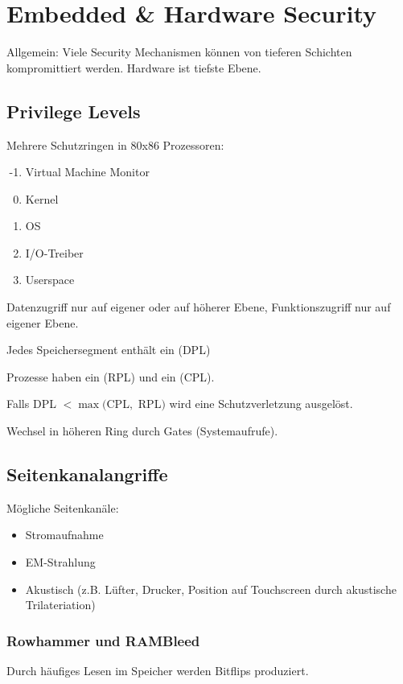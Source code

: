 \chapter{Embedded \& Hardware Security}
Allgemein: Viele Security Mechanismen können von tieferen Schichten kompromittiert werden.
Hardware ist tiefste Ebene.

\section{Privilege Levels}
Mehrere Schutzringen in 80x86 Prozessoren:
\begin{enumerate}
    \setcounter{enumi}{-2}
    \item Virtual Machine Monitor
    \item Kernel
    \item OS
    \item I/O-Treiber
    \item Userspace
\end{enumerate}

Datenzugriff nur auf eigener oder auf höherer Ebene, Funktionszugriff nur auf eigener Ebene.

\vspace{.3cm}

Jedes Speichersegment enthält ein  (DPL)

Prozesse haben ein  (RPL) und ein  (CPL).

Falls DPL $< \max($CPL$,$ RPL$)$ wird eine Schutzverletzung ausgelöst.

Wechsel in höheren Ring durch Gates (Systemaufrufe).


\section{Seitenkanalangriffe}
Mögliche Seitenkanäle:
\begin{itemize}
    \item Stromaufnahme
    \item EM-Strahlung
    \item Akustisch (z.B. Lüfter, Drucker, Position auf Touchscreen durch akustische Trilateriation)
\end{itemize}

\subsection{Rowhammer und RAMBleed}
Durch häufiges Lesen im Speicher werden Bitflips produziert.


